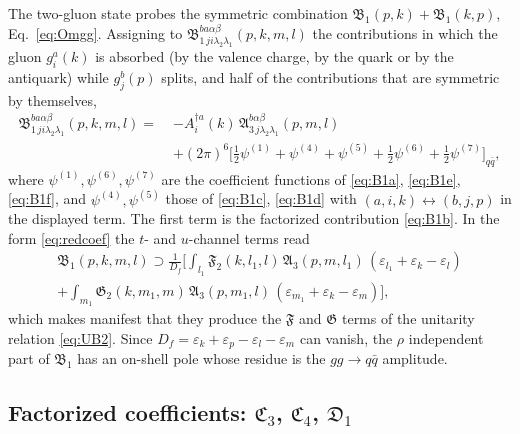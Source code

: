 \documentclass[11pt,a4paper]{article}
\numberwithin{equation}{section}
\newcommand{\mf}[1]{\mathfrak{#1}}
\newcommand{\eps}{\varepsilon}
\newcommand{\dg}{\dagger}
\newcommand{\gl}[3]{g^{#1}_{#2}(#3)}
\begin{document}
The two-gluon state probes the symmetric combination $\mf B_{1}(p,k)+\mf B_{1}(k,p)$,
Eq.~\eqref{eq:Omgg}. Assigning to $\mf B^{ba\alpha\beta}_{1\,ji\lambda_{2}\lambda_{1}}(p,k,m,l)$ the
contributions in which the gluon $\gl{a}{i}{k}$ is absorbed (by the valence charge, by the quark or
by the antiquark) while $\gl{b}{j}{p}$ splits, and half of the contributions that are symmetric by
themselves,
\begin{equation}
\boxed{\;
\begin{aligned}
\mf B^{ba\alpha\beta}_{1\,ji\lambda_{2}\lambda_{1}}(p,k,m,l)=\;&
-A^{\dg a}_{i}(k)\,\mf A^{b\alpha\beta}_{3\,j\lambda_{2}\lambda_{1}}(p,m,l)
\\&+(2\pi)^{6}\Big[\tfrac12\psi^{(1)}+\psi^{(4)}+\psi^{(5)}+\tfrac12\psi^{(6)}+\tfrac12\psi^{(7)}\Big]_{q\bar q},
\end{aligned}\;}
\label{eq:B1}
\end{equation}
where $\psi^{(1)},\psi^{(6)},\psi^{(7)}$ are the coefficient functions of \eqref{eq:B1a}, \eqref{eq:B1e},
\eqref{eq:B1f}, and $\psi^{(4)},\psi^{(5)}$ those of \eqref{eq:B1c}, \eqref{eq:B1d} with
$(a,i,k)\leftrightarrow(b,j,p)$ in the displayed term. The first term is the factorized
contribution \eqref{eq:B1b}. In the form \eqref{eq:redcoef} the $t$- and $u$-channel terms read
\begin{multline}
\mf B_{1}(p,k,m,l)\supset\frac{1}{D_{f}}\Big[\int_{l_{1}}\mf F_{2}(k,l_{1},l)\,\mf A_{3}(p,m,l_{1})\,(\eps_{l_{1}}+\eps_{k}-\eps_{l})
\\+\int_{m_{1}}\mf G_{2}(k,m_{1},m)\,\mf A_{3}(p,m_{1},l)\,(\eps_{m_{1}}+\eps_{k}-\eps_{m})\Big],
\label{eq:B1red}
\end{multline}
which makes manifest that they produce the $\mf F$ and $\mf G$ terms of the unitarity relation
\eqref{eq:UB2}. Since $D_{f}=\eps_{k}+\eps_{p}-\eps_{l}-\eps_{m}$ can vanish, the $\rho$ independent part
of $\mf B_{1}$ has an on-shell pole whose residue is the $gg\to q\bar q$ amplitude.

\subsection{Factorized coefficients: $\mf C_{3}$, $\mf C_{4}$, $\mf D_{1}$}
\end{document}
